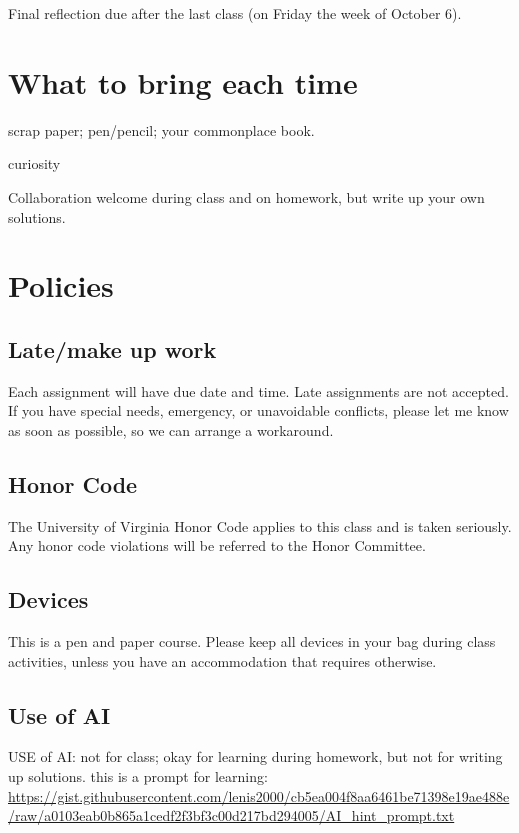 \documentclass[oneside,11pt]{amsart}
\begin{document}
Final reflection due after the last class (on Friday the week of October 6).

\section{What to bring each time}
scrap paper; pen/pencil; your commonplace book.

curiosity

Collaboration welcome during class and on homework, but write up your own solutions.







\section{Policies}

\subsection{Late/make up work}

Each assignment will have due date and time. Late assignments are not accepted. If you have special needs, emergency, or unavoidable conflicts, please let me know as soon as possible, so we can arrange a workaround.

\subsection{Honor Code}
The University of Virginia Honor Code applies to this class and is taken seriously. Any honor code violations will be referred to the Honor Committee. 

\subsection{Devices}

This is a pen and paper course. Please keep all devices in your bag during class activities, unless you have an accommodation that requires otherwise.

\subsection{Use of AI}

USE of AI: not for class; okay for learning during homework, but not for writing up solutions.
this is a prompt for learning: \url{https://gist.githubusercontent.com/lenis2000/cb5ea004f8aa6461be71398e19ae488e/raw/a0103eab0b865a1cedf2f3bf3c00d217bd294005/AI_hint_prompt.txt}
\end{document}
